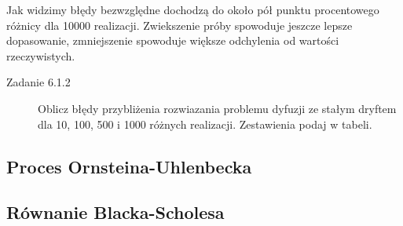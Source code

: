\documentclass[a4paper,12pt,polish]{sphinxmanual}
\begin{document}
Jak widzimy błędy bezwzględne dochodzą do około pół punktu procentowego różnicy dla 10000
realizacji. Zwiekszenie próby spowoduje jeszcze lepsze dopasowanie, zmniejszenie spowoduje
większe odchylenia od wartości rzeczywistych.
\begin{description}
\item[{Zadanie 6.1.2}] \leavevmode
Oblicz błędy przybliżenia rozwiazania problemu dyfuzji ze stałym dryftem dla 10, 100, 500 i
1000 różnych realizacji. Zestawienia podaj w tabeli.

\end{description}


\subsection{Proces Ornsteina-Uhlenbecka}
\label{ch5/chV013:proces-ornsteina-uhlenbecka}

\subsection{Równanie Blacka-Scholesa}
\label{ch5/chV013:id1}


\renewcommand{\indexname}{Indeks}
\printindex
\end{document}

